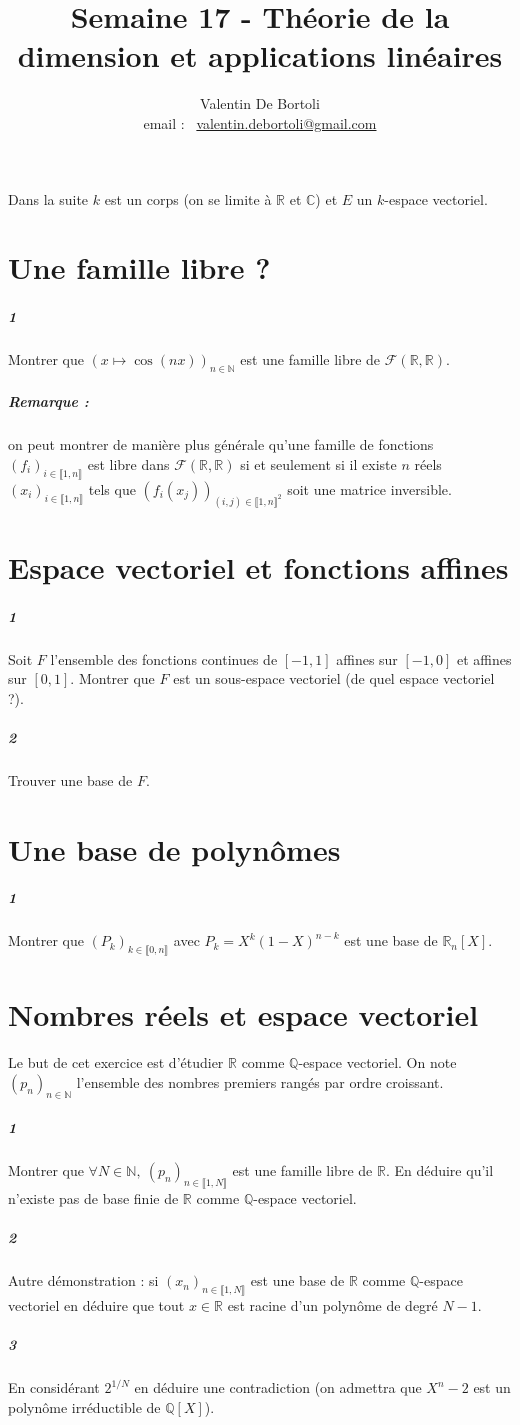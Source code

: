 \documentclass[10pt,a4paper]{article}
\title{Semaine 17 - Théorie de la dimension et applications linéaires}
\author{Valentin De Bortoli \\ email : \ \href{mailto:valentin.debortoli@gmail.com}{valentin.debortoli@gmail.com}}
\date{}
\begin{document}
\maketitle
Dans la suite $k$ est un corps (on se limite à $\mathbb{R}$ et $\mathbb{C}$) et $E$ un $k$-espace vectoriel.

\section{Une famille libre ?}
\subparagraph{1}Montrer que $(x \mapsto\cos(nx))_{n \in \mathbb{N}}$ est une famille libre de $\mathcal{F}(\mathbb{R},\mathbb{R})$.

\subparagraph{Remarque :} on peut montrer de manière plus générale qu'une famille de fonctions $(f_i)_{i \in \llbracket 1,n \rrbracket}$ est libre dans $\mathcal{F}(\mathbb{R},\mathbb{R})$ si et seulement si il existe $n$ réels $(x_i)_{i \in \llbracket 1,n \rrbracket}$ tels que $(f_i(x_j))_{(i,j) \in \llbracket 1,n\rrbracket^2}$ soit une matrice inversible. 

\section{Espace vectoriel et fonctions affines}
\subparagraph{1}Soit $F$ l'ensemble des fonctions continues de $[-1,1]$ affines sur $[-1,0]$ et affines sur $[0,1]$. Montrer que $F$ est un sous-espace vectoriel (de quel espace vectoriel ?).
\subparagraph{2}Trouver une base de $F$. 

\section{Une base de polynômes}
\subparagraph{1}Montrer que $(P_k)_{k \in \llbracket 0,n \rrbracket}$ avec $P_k=X^k(1-X)^{n-k}$ est une base de $\mathbb{R}_n[X]$. 

\section{Nombres réels et espace vectoriel}
Le but de cet exercice est d'étudier $\mathbb{R}$ comme $\mathbb{Q}$-espace vectoriel. On note $(p_n)_{n \in \mathbb{N}}$ l'ensemble des nombres premiers rangés par ordre croissant.
\subparagraph{1} Montrer que $\forall N \in \mathbb{N}, \ (p_n)_{n \in \llbracket 1,N \rrbracket}$ est une famille libre de $\mathbb{R}$. En déduire qu'il n'existe pas de base finie de $\mathbb{R}$ comme $\mathbb{Q}$-espace vectoriel.
\subparagraph{2} Autre démonstration : si $(x_n)_{n \in \llbracket 1,N \rrbracket}$ est une base de $\mathbb{R}$ comme $\mathbb{Q}$-espace vectoriel en déduire que tout $x\in \mathbb{R}$ est racine d'un polynôme de degré $N-1$.
\subparagraph{3}En considérant $2^{1/N}$ en déduire une contradiction (on admettra que $X^n-2$ est un polynôme irréductible de $\mathbb{Q}[X]$).
\end{document}
